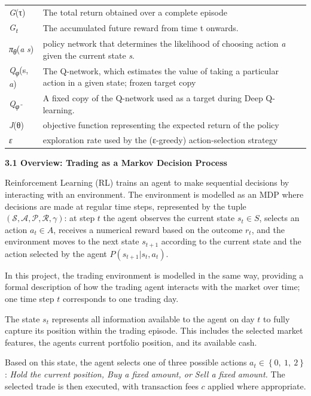 {\begin{longtable}[]{@{}
  >{\raggedright\arraybackslash}p{}
  >{\raggedright\arraybackslash}p{}@{}}
\emph{G}(τ) & The total return obtained over a complete episode \\
\emph{G\textsubscript{t}} & The accumulated future reward from time t
onwards. \\
\emph{π\textsubscript{θ}}(\emph{a} \textbar{} \emph{s}) & policy network
that determines the likelihood of choosing action \emph{a} given the
current state \emph{s}. \\
\emph{Q\textsubscript{φ}}(s, \emph{a}) & The Q-network, which estimates
the value of taking a particular action in a given state; frozen target
copy \\
\emph{Q\textsubscript{φ⁻}} & A fixed copy of the Q-network used as a
target during Deep Q-learning. \\
\emph{J}(θ) & objective function representing the expected return of the
policy \\
\emph{ε} & exploration rate used by the (ε-greedy) action-selection
strategy \\
\end{longtable}
}

\textbf{3.1 Overview: Trading as a Markov Decision Process}

Reinforcement Learning (RL) trains an agent to make sequential decisions
by interacting with an environment. The environment is modelled as an
MDP where decisions are made at regular time steps, represented by the
tuple~\(\left( \mathcal{S},\mathcal{A},\mathcal{P},\mathcal{R},\gamma \right)\):
at step \(t\) the agent observes the current state \(s_{t} \in S\),
selects an action \(a_{t} \in A\), receives a numerical reward based on
the outcome \(r_{t}\), and the environment moves to the next state
\(s_{t + 1}\) according to the current state and the action selected by
the agent \(P(s_{t + 1}|s_{t},a_{t})\).

In this project, the trading environment is modelled in the same way,
providing a formal description of how the trading agent interacts with
the market over time; one time step \(t\) corresponds to one trading
day.

The state \(s_{t}\) represents all information available to the agent on
day \(t\) to fully capture its position within the trading episode. This
includes the selected market features, the agent\textquotesingle s
current portfolio position, and its available cash.

Based on this state, the agent selects one of three possible actions
\(a_{t} \in \left\{ 0,\ 1,\ 2 \right\}\): \emph{Hold the current
position, Buy a fixed amount, or Sell a fixed amount.} The selected
trade is then executed, with transaction fees \(c\) applied where
appropriate.

